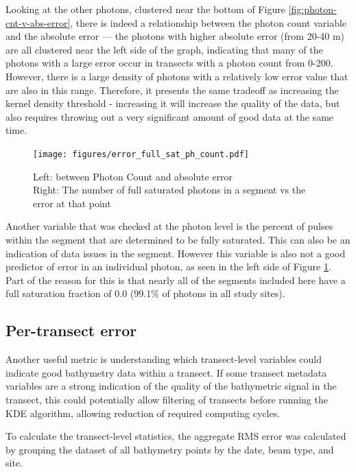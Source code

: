 Looking at the other photons, clustered near the bottom of Figure \ref{fig:photon-cnt-v-abs-error}, there is indeed a relationship between the photon count variable and the absolute error --- the photons with higher absolute error (from 20-40 m) are all clustered near the left side of the graph, indicating that many of the photons with a large error occur in transects with a photon count from 0-200. However, there is a large density of photons with a relatively low error value that are also in this range. Therefore, it presents the same tradeoff as increasing the kernel density threshold - increasing it will increase the quality of the data, but also requires throwing out a very significant amount of good data at the same time.

\begin{figure}[htbp]
    \centering
    \texttt{[image: figures/error\_full\_sat\_ph\_count.pdf]}
    \caption[Photon error vs segment photon count and the fraction of fully-saturated returns in the segment]{Left: between Photon Count and absolute error \\ Right: The number of full saturated photons in a segment vs the error at that point}
    \label{fig:error-photon}
\end{figure}
Another variable that was checked at the photon level is the percent of pulses within the segment that are determined to be fully saturated. This can also be an indication of data issues in the segment. However this variable is also not a good predictor of error in an individual photon, as seen in the left side of Figure \ref{fig:error-photon}. Part of the reason for this is that nearly all of the segments included here have a full saturation fraction of 0.0 (99.1\% of photons in all study sites).

\subsection{Per-transect error}

Another useful metric is understanding which transect-level variables could indicate good bathymetry data within a transect. If some transect metadata variables are a strong indication of the quality of the bathymetric signal in the transect, this could potentially allow filtering of transects before running the KDE algorithm, allowing reduction of required computing cycles.

To calculate the transect-level statistics, the aggregate RMS error was calculated by grouping the dataset of all bathymetry points by the date, beam type, and site.

